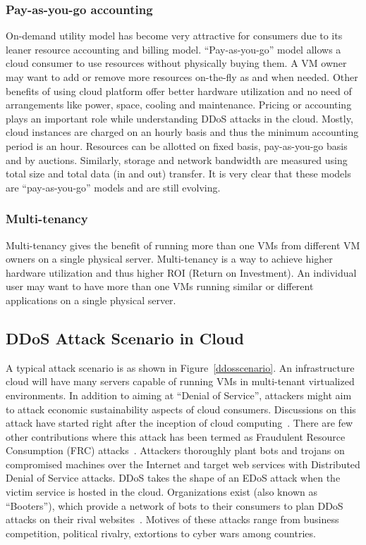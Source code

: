 \documentclass[final,5p,times,twocolumn]{elsarticle}
\begin{document}
\subsubsection{Pay-as-you-go accounting} On-demand utility model has become very attractive for consumers due to its leaner resource accounting and billing model. ``Pay-as-you-go'' model allows a cloud consumer to use resources without physically buying them. A VM owner may want to add or remove more resources on-the-fly as and when needed. Other benefits of using cloud platform offer better hardware utilization and no need of arrangements like power, space, cooling and maintenance. Pricing or accounting plays an important role while understanding DDoS attacks in the cloud. Mostly, cloud instances are charged on an hourly basis and thus the minimum accounting period is an hour. Resources can be allotted on fixed basis, pay-as-you-go basis and by auctions. Similarly, storage and network bandwidth are measured using total size and total data (in and out) transfer. It is very clear that these models are ``pay-as-you-go'' models and are still evolving.
\subsubsection{Multi-tenancy} Multi-tenancy gives the benefit of running more than one VMs from different VM owners on a single physical server. Multi-tenancy is a way to achieve higher hardware utilization and thus higher ROI (Return on Investment). An individual user may want to have more than one VMs running similar or different applications on a single physical server.

\subsection{DDoS Attack Scenario in Cloud}
\label{scenario}
A typical attack scenario is as shown in Figure~\ref{ddosscenario}. An infrastructure cloud will have many servers capable of running VMs in multi-tenant virtualized environments. In addition to aiming at  ``Denial of Service'', attackers might aim to attack economic sustainability aspects of cloud consumers. Discussions on this attack have started right after the inception of cloud computing~\cite{cohen}. There are few other contributions where this attack has been termed as Fraudulent Resource Consumption (FRC) attacks~\cite{Idziorek11}. Attackers thoroughly plant bots and trojans on compromised machines over the Internet and target web services with Distributed Denial of Service attacks. DDoS takes the shape of an EDoS attack when the victim service is hosted in the cloud. Organizations exist (also known as ``Booters''), which provide a network of bots to their consumers to plan DDoS attacks on their rival websites~\cite{booters}. Motives of these attacks range from business competition, political rivalry, extortions to cyber wars among countries. 
\end{document}

